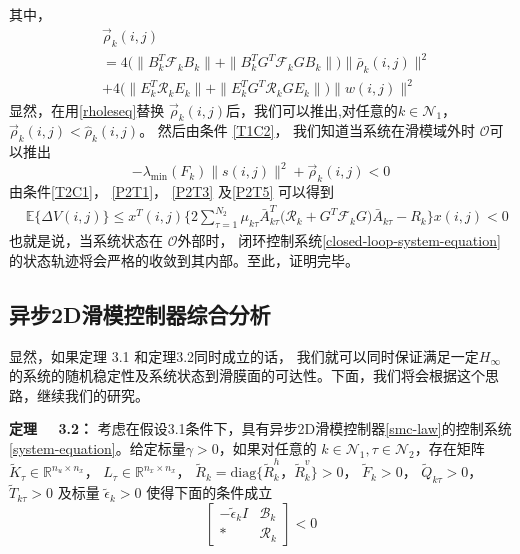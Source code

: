 	其中，
	\begin{equation*}
	\begin{split}
	&\vec{\rho}_{k}(i,j)\\
	&= 4\big(\|B^{T}_{k}\mathcal{F}_{k}B_{k}\|+ \|B^{T}_{k}G^{T}\mathcal{F}_{k}GB_{k}\|\big) \|\bar{\rho}_{k}(i,j)\|^{2} \\
	&+ 4\big(\|E^{T}_{k}\mathcal{R}_{k}E_{k}\|+ \|E^{T}_{k}G^{T}\mathcal{R}_{k}GE_{k}\|\big) \|w(i,j)\|^{2} 
	\end{split}
	\end{equation*}  
	显然，在用\eqref{rholeseq}替换 $\vec{\rho}_{k}(i,j)$后，我们可以推出,对任意的$k\in\mathcal{N}_{1}$， $\vec{\rho}_{k}(i,j) < \hat{\rho}_{k}(i,j)$。
	然后由条件 \eqref{T1C2}， 我们知道当系统在滑模域外时 $\mathcal{O}$可以推出
	\begin{equation}\label{P2T5}
	-\lambda_{\mathrm{min}}(F_{k})\|s(i,j)\|^{2} + \vec{\rho}_{k}(i,j) <0
	\end{equation}
	由条件\eqref{T2C1}， \eqref{P2T1}， \eqref{P2T3} 及\eqref{P2T5} 可以得到
	\begin{equation}
	\begin{split}
	&\mathbb{E}\{\varDelta V(i,j) \} \leq x^{T}(i,j)\Big\{ 2\sum_{\tau =1}^{N_{2}}\mu_{k\tau }\bar{A}^{T}_{k\tau }\big(\mathcal{R}_{k} +G^{T}\mathcal{F}_{k}G \big)\bar{A}_{k\tau } -R_{k} \Big\} x(i,j)<0
	\end{split}
	\end{equation}
	也就是说，当系统状态在 $\mathcal{O}$外部时，  闭环控制系统\eqref{closed-loop-system-equation} 的状态轨迹将会严格的收敛到其内部。至此，证明完毕。
	
	
\subsection{异步2D滑模控制器综合分析 }\label{smc-law-synthesis} 
	显然，如果定理 3.1 和定理3.2同时成立的话， 我们就可以同时保证满足一定$H_{\infty}$的系统的随机稳定性及系统状态到滑膜面的可达性。下面，我们将会根据这个思路，继续我们的研究。
	
	{\bf 定理 \ \ 3.2：}
	考虑在假设3.1条件下，具有异步2D滑模控制器\eqref{smc-law}的控制系统 \eqref{system-equation}。给定标量$\gamma>0$，如果对任意的 $k\in\mathcal{N}_{1}, \tau\in\mathcal{N}_{2}$，存在矩阵 $\tilde{K}_{\tau }\in\mathbb{R}^{n_u\times n_x}$， $L_{\tau }\in\mathbb{R}^{n_x\times n_x}$， $\tilde{R}_{k}=\mathrm{diag}\{\tilde{R}^{h}_{k}，\tilde{R}^{v}_{k}\}>0$， $\tilde{F}_{k}>0$，  $\tilde{Q}_{k\tau }>0$， $\tilde{T}_{k\tau }>0$ 及标量 $\tilde{\epsilon}_{k}>0$ 使得下面的条件成立
	\begin{equation} \label{T3C1}
	\begin{bmatrix}
	-\tilde{\epsilon}_{k}I &\mathscr{B}_{k}\\
	*& \mathscr{R}_{k}
	\end{bmatrix} < 0
	\end{equation}
	
